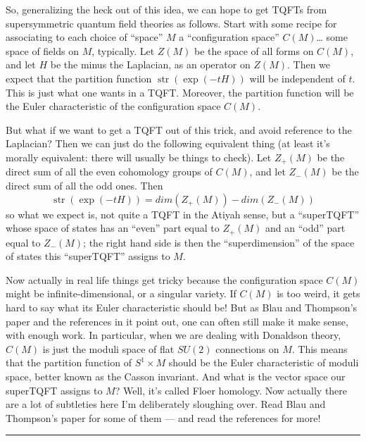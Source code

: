 \documentclass{article}
\begin{document}
So, generalizing the heck out of this idea, we can hope to get TQFTs
from supersymmetric quantum field theories as follows. Start with some
recipe for associating to each choice of ``space'' \(M\) a
``configuration space'' \(C(M)\)\ldots{} some space of fields on \(M\),
typically. Let \(Z(M)\) be the space of all forms on \(C(M)\), and let
\(H\) be the minus the Laplacian, as an operator on \(Z(M)\). Then we
expect that the partition function \(\operatorname{str}(\exp(-tH))\)
will be independent of \(t\). This is just what one wants in a TQFT.
Moreover, the partition function will be the Euler characteristic of the
configuration space \(C(M)\).

But what if we want to get a TQFT out of this trick, and avoid reference
to the Laplacian? Then we can just do the following equivalent thing (at
least it's morally equivalent: there will usually be things to check).
Let \(Z_+(M)\) be the direct sum of all the even cohomology groups of
\(C(M)\), and let \(Z_-(M)\) be the direct sum of all the odd ones. Then
\[\operatorname{str}(\exp(-tH)) = dim(Z_+(M))-dim(Z_-(M))\] so what we
expect is, not quite a TQFT in the Atiyah sense, but a ``superTQFT''
whose space of states has an ``even'' part equal to \(Z_+(M)\) and an
``odd'' part equal to \(Z_-(M)\); the right hand side is then the
``superdimension'' of the space of states this ``superTQFT'' assigns to
\(M\).

Now actually in real life things get tricky because the configuration
space \(C(M)\) might be infinite-dimensional, or a singular variety. If
\(C(M)\) is too weird, it gets hard to say what its Euler characteristic
should be! But as Blau and Thompson's paper and the references in it
point out, one can often still make it make sense, with enough work. In
particular, when we are dealing with Donaldson theory, \(C(M)\) is just
the moduli space of flat \(SU(2)\) connections on \(M\). This means that
the partition function of \(S^1\times M\) should be the Euler
characteristic of moduli space, better known as the Casson invariant.
And what is the vector space our superTQFT assigns to \(M\)? Well, it's
called Floer homology. Now actually there are a lot of subtleties here
I'm deliberately sloughing over. Read Blau and Thompson's paper for some
of them --- and read the references for more!

\begin{center}\rule{0.5\linewidth}{0.5pt}\end{center}
\end{document}
